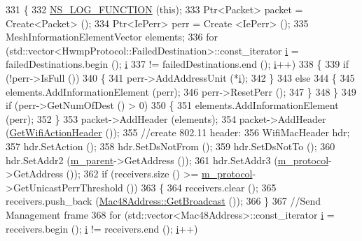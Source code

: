 \begin{DoxyCode}
331 \{
332   \hyperlink{log-macros-disabled_8h_a90b90d5bad1f39cb1b64923ea94c0761}{NS\_LOG\_FUNCTION} (\textcolor{keyword}{this});
333   Ptr<Packet> packet = Create<Packet> ();
334   Ptr<IePerr> perr = Create <IePerr> ();
335   MeshInformationElementVector elements;
336   \textcolor{keywordflow}{for} (std::vector<HwmpProtocol::FailedDestination>::const\_iterator \hyperlink{bernuolliDistribution_8m_a6f6ccfcf58b31cb6412107d9d5281426}{i} = failedDestinations.begin (); 
      \hyperlink{bernuolliDistribution_8m_a6f6ccfcf58b31cb6412107d9d5281426}{i}
337        != failedDestinations.end (); \hyperlink{bernuolliDistribution_8m_a6f6ccfcf58b31cb6412107d9d5281426}{i}++)
338     \{
339       \textcolor{keywordflow}{if} (!perr->IsFull ())
340         \{
341           perr->AddAddressUnit (*\hyperlink{bernuolliDistribution_8m_a6f6ccfcf58b31cb6412107d9d5281426}{i});
342         \}
343       \textcolor{keywordflow}{else}
344         \{
345           elements.AddInformationElement (perr);
346           perr->ResetPerr ();
347         \}
348     \}
349   \textcolor{keywordflow}{if} (perr->GetNumOfDest () > 0)
350     \{
351       elements.AddInformationElement (perr);
352     \}
353   packet->AddHeader (elements);
354   packet->AddHeader (\hyperlink{classns3_1_1dot11s_1_1HwmpProtocolMac_a0f40598c892522fe335b6b4d2190738f}{GetWifiActionHeader} ());
355   \textcolor{comment}{//create 802.11 header:}
356   WifiMacHeader hdr;
357   hdr.SetAction ();
358   hdr.SetDsNotFrom ();
359   hdr.SetDsNotTo ();
360   hdr.SetAddr2 (\hyperlink{classns3_1_1dot11s_1_1HwmpProtocolMac_accb34aacf86b332bd47c5492f1a0165c}{m\_parent}->GetAddress ());
361   hdr.SetAddr3 (\hyperlink{classns3_1_1dot11s_1_1HwmpProtocolMac_a6a05e798e264c97e2b5c484a29270b7d}{m\_protocol}->GetAddress ());
362   \textcolor{keywordflow}{if} (receivers.size () >= \hyperlink{classns3_1_1dot11s_1_1HwmpProtocolMac_a6a05e798e264c97e2b5c484a29270b7d}{m\_protocol}->GetUnicastPerrThreshold ())
363     \{
364       receivers.clear ();
365       receivers.push\_back (\hyperlink{classns3_1_1Mac48Address_a55156e302c6bf950c0b558365adbde84}{Mac48Address::GetBroadcast} ());
366     \}
367   \textcolor{comment}{//Send Management frame}
368   \textcolor{keywordflow}{for} (std::vector<Mac48Address>::const\_iterator \hyperlink{bernuolliDistribution_8m_a6f6ccfcf58b31cb6412107d9d5281426}{i} = receivers.begin (); \hyperlink{bernuolliDistribution_8m_a6f6ccfcf58b31cb6412107d9d5281426}{i} != receivers.end (); 
      \hyperlink{bernuolliDistribution_8m_a6f6ccfcf58b31cb6412107d9d5281426}{i}++)

\end{DoxyCode}

